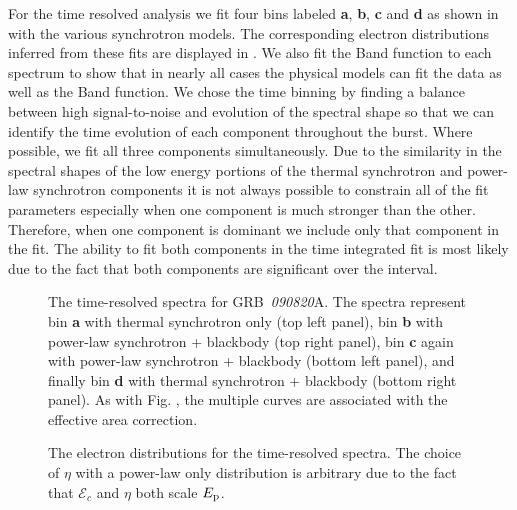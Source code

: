 For the time resolved analysis we fit four bins labeled {\textbf a},
{\textbf b}, {\textbf c} and {\textbf d} as shown in
 with the various synchrotron models. The
corresponding electron distributions inferred from these fits are
displayed in . We also fit the Band function to
each spectrum to show that in nearly all cases the physical models can
fit the data as well as the Band function. We chose the time binning
by finding a balance between high signal-to-noise and evolution of the
spectral shape so that we can identify the time evolution of each
component throughout the burst. Where possible, we fit all three
components simultaneously. Due to the similarity in the spectral
shapes of the low energy portions of the thermal synchrotron and
power-law synchrotron components it is not always possible to
constrain all of the fit parameters especially when one component is
much stronger than the other. Therefore, when one component is
dominant we include only that component in the fit. The ability to fit
both components in the time integrated fit is most likely due to the
fact that both components are significant over the interval.
\begin{figure}[h]
\centering
{}

\caption{The time-resolved
  spectra for GRB~{\it 090820}A. The spectra represent bin \textbf{a}
  with thermal synchrotron only (top left panel), bin \textbf{b} with
  power-law synchrotron + blackbody (top right panel), bin \textbf{c}
  again with power-law synchrotron + blackbody (bottom left panel),
  and finally bin \textbf{d} with thermal synchrotron + blackbody
  (bottom right panel). As with Fig. , the
  multiple curves are associated with the effective area correction.}
\label{fig:figure4}
\end{figure}


\begin{figure}
\centering
{}
\label{fig:figure5}
\caption{The electron distributions for the time-resolved spectra. The choice of $\eta$ with a power-law only distribution is arbitrary due to the fact that $\mathcal{E}_c$ and $\eta$ both scale $E_{\rm p}$.}
\end{figure}


